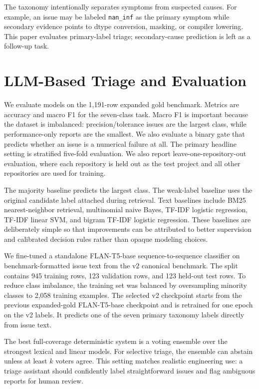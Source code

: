 \documentclass[conference]{IEEEtran}
\begin{document}
The taxonomy intentionally separates symptoms from suspected causes. For
example, an issue may be labeled \texttt{nan\_inf} as the primary symptom while
secondary evidence points to dtype conversion, masking, or compiler lowering.
This paper evaluates primary-label triage; secondary-cause prediction is left
as a follow-up task.

\section{LLM-Based Triage and Evaluation}

We evaluate models on the 1,191-row expanded gold benchmark. Metrics are
accuracy and macro F1 for the seven-class task. Macro F1 is important because
the dataset is imbalanced: precision/tolerance issues are the largest class,
while performance-only reports are the smallest. We also evaluate a binary
gate that predicts whether an issue is a numerical failure at all. The primary
headline setting is stratified five-fold evaluation. We also report
leave-one-repository-out evaluation, where each repository is held out as the
test project and all other repositories are used for training.

The majority baseline predicts the largest class. The weak-label baseline uses
the original candidate label attached during retrieval. Text baselines include
BM25 nearest-neighbor retrieval, multinomial naive Bayes, TF-IDF logistic
regression, TF-IDF linear SVM, and bigram TF-IDF logistic regression. These
baselines are deliberately simple so that improvements can be attributed to
better supervision and calibrated decision rules rather than opaque modeling
choices.

We fine-tuned a standalone FLAN-T5-base sequence-to-sequence classifier on
benchmark-formatted issue text from the v2 canonical benchmark. The split
contains 945 training rows, 123 validation rows, and 123 held-out test rows. To
reduce class imbalance, the training set was balanced by oversampling minority
classes to 2,058 training examples. The selected v2 checkpoint starts from the
previous expanded-gold FLAN-T5-base checkpoint and is retrained for one epoch
on the v2 labels. It predicts one of the seven primary taxonomy labels directly
from issue text.

The best full-coverage deterministic system is a voting ensemble over the
strongest lexical and linear models. For selective triage, the ensemble can
abstain unless at least $k$ voters agree. This setting matches realistic
engineering use: a triage assistant should confidently label straightforward
issues and flag ambiguous reports for human review.
\end{document}
